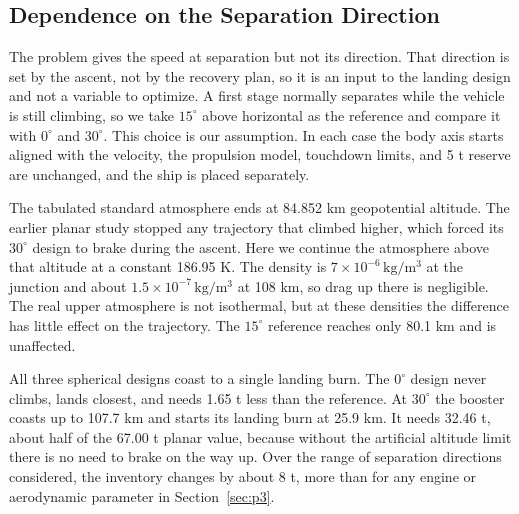 \subsection{Dependence on the Separation Direction}
\label{sec:separation-direction}
The problem gives the speed at separation but not its direction. That direction is set by the ascent, not by the recovery plan, so it is an input to the landing design and not a variable to optimize. A first stage normally separates while the vehicle is still climbing, so we take $15^\circ$ above horizontal as the reference and compare it with $0^\circ$ and $30^\circ$. This choice is our assumption. In each case the body axis starts aligned with the velocity, the propulsion model, touchdown limits, and 5 t reserve are unchanged, and the ship is placed separately.

The tabulated standard atmosphere ends at 84.852 km geopotential altitude. The earlier planar study stopped any trajectory that climbed higher, which forced its $30^\circ$ design to brake during the ascent. Here we continue the atmosphere above that altitude at a constant 186.95 K. The density is $7\times10^{-6}\,\mathrm{kg/m^3}$ at the junction and about $1.5\times10^{-7}\,\mathrm{kg/m^3}$ at 108 km, so drag up there is negligible. The real upper atmosphere is not isothermal, but at these densities the difference has little effect on the trajectory. The $15^\circ$ reference reaches only 80.1 km and is unaffected.



All three spherical designs coast to a single landing burn. The $0^\circ$ design never climbs, lands closest, and needs 1.65 t less than the reference. At $30^\circ$ the booster coasts up to 107.7 km and starts its landing burn at 25.9 km. It needs 32.46 t, about half of the 67.00 t planar value, because without the artificial altitude limit there is no need to brake on the way up. Over the range of separation directions considered, the inventory changes by about 8 t, more than for any engine or aerodynamic parameter in Section~\ref{sec:p3}.
